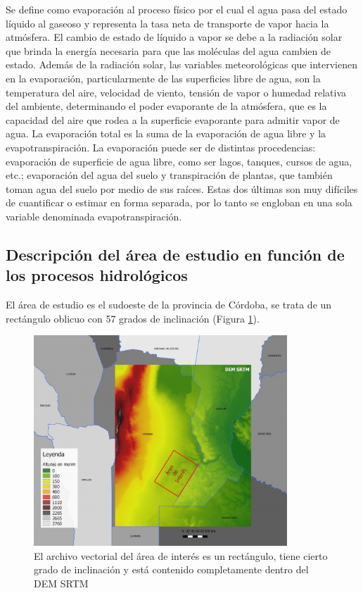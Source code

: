 \documentclass[10pt,a4paper, twoside]{report}
\begin{document}
Se define como evaporación al proceso físico
por el cual el agua pasa del estado líquido al
gaseoso y representa la tasa neta de transporte
de vapor hacia la atmósfera.
El cambio de estado de líquido a vapor se debe
a la radiación solar que brinda la energía necesaria
para que las moléculas del agua cambien
de estado. Además de la radiación solar, las
variables meteorológicas que intervienen en la
evaporación, particularmente de las superficies
libre de agua, son la temperatura del aire, velocidad
de viento, tensión de vapor o humedad
relativa del ambiente, determinando el poder
evaporante de la atmósfera, que es la capacidad
del aire que rodea a la superficie evaporante
para admitir vapor de agua.
La evaporación total es la suma de la evaporación
de agua libre y la evapotranspiración.
La evaporación puede ser de distintas procedencias:
evaporación de superficie de agua libre,
como ser lagos, tanques, cursos de agua, etc.;
evaporación del agua del suelo y transpiración
de plantas, que también toman agua del suelo
por medio de sus raíces. Estas dos últimas son
muy difíciles de cuantificar o estimar en forma
separada, por lo tanto se engloban en una sola
variable denominada evapotranspiración.

\subsection{Descripción del área de estudio en función de los procesos hidrológicos}
\label{subsec:introModelo}

El área de estudio es el sudoeste de la provincia de Córdoba, se trata de un rectángulo oblicuo con 57 grados de inclinación (Figura \ref{SRTMAndShape}).

\begin{figure}[!htb]
   \centering      
   \includegraphics[width=0.85\textwidth]{imagenes/SRTMOriginalAndShape4.pdf}
 \caption{El archivo vectorial del área de interés es un rectángulo, tiene cierto grado de inclinación y está contenido completamente dentro del DEM SRTM}
 \label{SRTMAndShape}
\end{figure}
\end{document}
